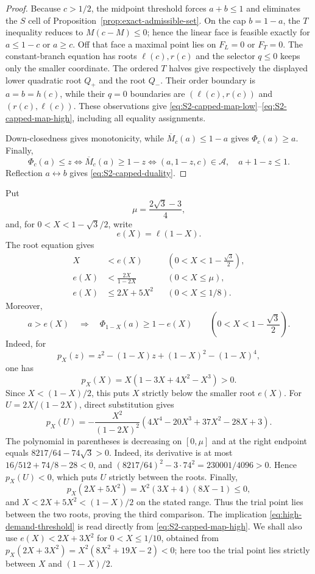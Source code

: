 \begin{proof}
Because $c>1/2$, the midpoint threshold forces $a+b\le1$ and eliminates the $S$ cell of
Proposition~\ref{prop:exact-admissible-set}.  On the cap $b=1-a$, the $T$
inequality reduces to $M(c-M)\le0$; hence the linear face is feasible exactly
for $a\le1-c$ or $a\ge c$.  Off that face a maximal point lies on $F_L=0$
or $F_T=0$.  The constant-branch equation has roots $\ell(c),r(c)$ and the selector
$q\le0$ keeps only the smaller coordinate.  The ordered $T$ halves give
respectively the displayed lower quadratic root $Q_+$ and the root $Q_-$.
Their order boundary is $a=b=h(c)$, while their $q=0$ boundaries are
$(\ell(c),r(c))$ and $(r(c),\ell(c))$.  These observations give
\eqref{eq:S2-capped-map-low}--\eqref{eq:S2-capped-map-high}, including all equality
assignments.

Down-closedness gives monotonicity, while $\overline M_c(a)\le1-a$ gives
$\Phi_c(a)\ge a$.  Finally,
\[
 \Phi_c(a)\le z\iff \overline M_c(a)\ge1-z
 \iff(a,1-z,c)\in\mathcal A,\quad a+1-z\le1.
\]
Reflection $a\leftrightarrow b$ gives \eqref{eq:S2-capped-duality}.
\end{proof}

Put
\[
 \mu=\frac{2\sqrt3-3}{4},
\]
and, for $0<X<1-\sqrt3/2$, write
\[
 e(X)=\ell(1-X).
\]
The root equation gives
\begin{equation}
 \begin{aligned}
 X&<e(X) &&\left(0<X<1-\frac{\sqrt3}{2}\right),\\
 e(X)&<\frac{2X}{1-2X} &&(0<X\le\mu),\\
 e(X)&\le2X+5X^2 &&(0<X\le1/8).
 \end{aligned}
 \label{eq:low-root-bounds}
\end{equation}
Moreover,
\begin{equation}
 a>e(X)\quad\Longrightarrow\quad
 \Phi_{1-X}(a)\ge1-e(X)
 \qquad\left(0<X<1-\frac{\sqrt3}{2}\right).
 \label{eq:high-demand-threshold}
\end{equation}
Indeed, for
\[
 p_X(z)=z^2-(1-X)z+(1-X)^2-(1-X)^4,
\]
one has
\[
 p_X(X)=X(1-3X+4X^2-X^3)>0.
\]
Since $X<(1-X)/2$, this puts $X$ strictly below the smaller root $e(X)$.
For $U=2X/(1-2X)$, direct substitution gives
\[
 p_X(U)=-\frac{X^2}{(1-2X)^2}
 (4X^4-20X^3+37X^2-28X+3).
\]
The polynomial in parentheses is decreasing on $[0,\mu]$ and at the right
endpoint equals $8217/64-74\sqrt3>0$.  Indeed, its derivative is at most
$16/512+74/8-28<0$, and
$(8217/64)^2-3\mathbin{\cdot}74^2=230001/4096>0$.  Hence $p_X(U)<0$, which puts $U$
strictly between the roots.  Finally,
\[
 p_X(2X+5X^2)=X^2(3X+4)(8X-1)\le0,
\]
and $X<2X+5X^2<(1-X)/2$ on the stated range.  Thus the trial point lies
between the two roots, proving the third comparison.  The implication
\eqref{eq:high-demand-threshold} is read directly from
\eqref{eq:S2-capped-map-high}.  We shall also use
$e(X)<2X+3X^2$ for $0<X\le1/10$, obtained from
$p_X(2X+3X^2)=X^2(8X^2+19X-2)<0$; here too the trial point lies strictly
between $X$ and $(1-X)/2$.
